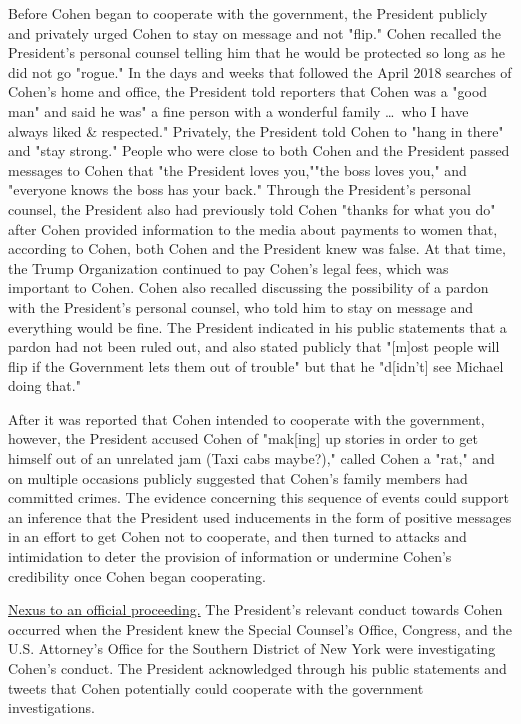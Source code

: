 {Before Cohen began to cooperate with the government, the President publicly and privately urged Cohen to stay on message and not "flip." Cohen recalled the President's personal counsel telling him that he would be protected so long as he did not go "rogue."
In the days and weeks that followed the April 2018 searches of Cohen's home and office, the President told reporters that Cohen was a "good man" and said he was" a fine person with a wonderful family \dots\ who I have always liked \& respected."
Privately, the President told Cohen to "hang in there" and "stay strong." People who were close to both Cohen and the President passed messages to Cohen that "the President loves you,""the boss loves you," and "everyone knows the boss has your back."
Through the President's personal counsel, the President also had previously told Cohen "thanks for what you do" after Cohen provided information to the media about payments to women that, according to Cohen, both Cohen and the President knew was false.
At that time, the Trump Organization continued to pay Cohen's legal fees, which was important to Cohen.
Cohen also recalled discussing the possibility of a pardon with the President's personal counsel, who told him to stay on message and everything would be fine.
The President indicated in his public statements that a pardon had not been ruled out, and also stated publicly that "[m]ost people will flip if the Government lets them out of trouble" but that he "d[idn't] see Michael doing that."

After it was reported that Cohen intended to cooperate with the government, however, the President accused Cohen of "mak[ing] up stories in order to get himself out of an unrelated jam (Taxi cabs maybe?)," called Cohen a "rat," and on multiple occasions publicly suggested that Cohen's family members had committed crimes.
The evidence concerning this sequence of events could support an inference that the President used inducements in the form of positive messages in an effort to get Cohen not to cooperate, and then turned to attacks and intimidation to deter the provision of information or undermine Cohen's credibility once Cohen began cooperating.

\underline{Nexus to an official proceeding.}
The President's relevant conduct towards Cohen occurred when the President knew the Special Counsel's Office, Congress, and the U.S. Attorney's Office for the Southern District of New York were investigating Cohen's conduct.
The President acknowledged through his public statements and tweets that Cohen potentially could cooperate with the government investigations.

}
